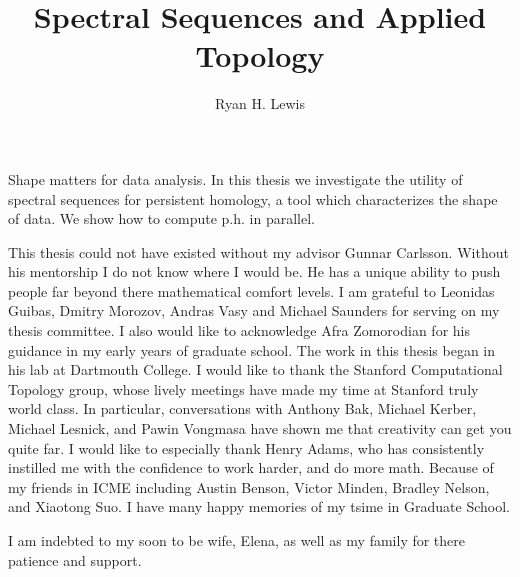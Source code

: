 \documentclass[12pt,twsoside]{report}
\title{Spectral Sequences and Applied Topology}
\author{Ryan H. Lewis}
\begin{document}
\maketitle

%
Shape matters for data analysis. In this thesis we investigate the utility of spectral sequences for persistent homology, a tool which characterizes the shape of data. We show how to compute p.h. in parallel. 


This thesis could not have existed without my advisor Gunnar Carlsson. Without his mentorship I do not know where I would be. He has a unique ability to push people far beyond there mathematical comfort levels. I am grateful to Leonidas Guibas, Dmitry Morozov, Andras Vasy and Michael Saunders for serving on my thesis committee. I also would like to acknowledge Afra Zomorodian for his guidance in my early years of graduate school. The work in this thesis began in his lab at Dartmouth College. I would like to thank the Stanford Computational Topology group, whose lively meetings have made my time at Stanford truly world class. In particular, conversations with Anthony Bak, Michael Kerber, Michael Lesnick, and Pawin Vongmasa have shown me that creativity can get you quite far. I would like to especially thank Henry Adams, who has consistently instilled me with the confidence to work harder, and do more math. Because of my friends in ICME including Austin Benson, Victor Minden, Bradley Nelson, and Xiaotong Suo. I have many happy memories of my tsime in Graduate School. 

I am indebted to my soon to be wife, Elena, as well as my family for there patience and support.

 \afterpreface
%





%
%
%




% 
\end{document}
